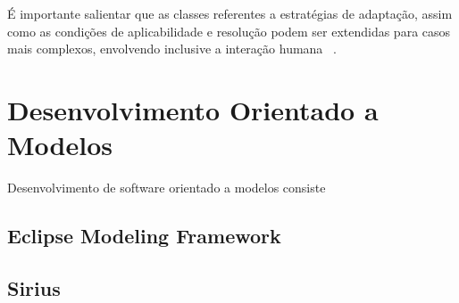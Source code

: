 É importante salientar que as classes referentes a estratégias de adaptação, assim como as condições de aplicabilidade e resolução podem ser extendidas para casos mais complexos, envolvendo inclusive a interação humana ~\cite{tesevitor}.




\section{Desenvolvimento Orientado a Modelos}

Desenvolvimento de software orientado a modelos consiste 

\subsection{Eclipse Modeling Framework}
\subsection{Sirius}
